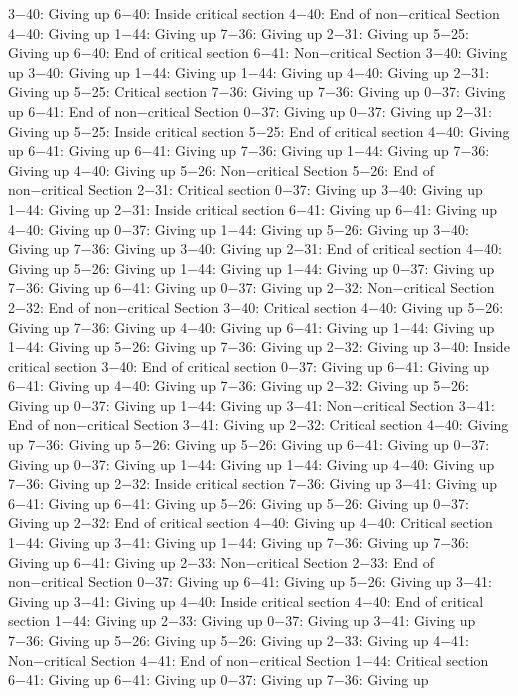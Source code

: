 3−40: Giving up
6−40: Inside critical section
4−40: End of non−critical Section
4−40: Giving up
1−44: Giving up
7−36: Giving up
2−31: Giving up
5−25: Giving up
6−40: End of critical section
6−41: Non−critical Section
3−40: Giving up
3−40: Giving up
1−44: Giving up
1−44: Giving up
4−40: Giving up
2−31: Giving up
5−25: Critical section
7−36: Giving up
7−36: Giving up
0−37: Giving up
6−41: End of non−critical Section
0−37: Giving up
0−37: Giving up
2−31: Giving up
5−25: Inside critical section
5−25: End of critical section
4−40: Giving up
6−41: Giving up
6−41: Giving up
7−36: Giving up
1−44: Giving up
7−36: Giving up
4−40: Giving up
5−26: Non−critical Section
5−26: End of non−critical Section
2−31: Critical section
0−37: Giving up
3−40: Giving up
1−44: Giving up
2−31: Inside critical section
6−41: Giving up
6−41: Giving up
4−40: Giving up
0−37: Giving up
1−44: Giving up
5−26: Giving up
3−40: Giving up
7−36: Giving up
3−40: Giving up
2−31: End of critical section
4−40: Giving up
5−26: Giving up
1−44: Giving up
1−44: Giving up
0−37: Giving up
7−36: Giving up
6−41: Giving up
0−37: Giving up
2−32: Non−critical Section
2−32: End of non−critical Section
3−40: Critical section
4−40: Giving up
5−26: Giving up
7−36: Giving up
4−40: Giving up
6−41: Giving up
1−44: Giving up
1−44: Giving up
5−26: Giving up
7−36: Giving up
2−32: Giving up
3−40: Inside critical section
3−40: End of critical section
0−37: Giving up
6−41: Giving up
6−41: Giving up
4−40: Giving up
7−36: Giving up
2−32: Giving up
5−26: Giving up
0−37: Giving up
1−44: Giving up
3−41: Non−critical Section
3−41: End of non−critical Section
3−41: Giving up
2−32: Critical section
4−40: Giving up
7−36: Giving up
5−26: Giving up
5−26: Giving up
6−41: Giving up
0−37: Giving up
0−37: Giving up
1−44: Giving up
1−44: Giving up
4−40: Giving up
7−36: Giving up
2−32: Inside critical section
7−36: Giving up
3−41: Giving up
6−41: Giving up
6−41: Giving up
5−26: Giving up
5−26: Giving up
0−37: Giving up
2−32: End of critical section
4−40: Giving up
4−40: Critical section
1−44: Giving up
3−41: Giving up
1−44: Giving up
7−36: Giving up
7−36: Giving up
6−41: Giving up
2−33: Non−critical Section
2−33: End of non−critical Section
0−37: Giving up
6−41: Giving up
5−26: Giving up
3−41: Giving up
3−41: Giving up
4−40: Inside critical section
4−40: End of critical section
1−44: Giving up
2−33: Giving up
0−37: Giving up
3−41: Giving up
7−36: Giving up
5−26: Giving up
5−26: Giving up
2−33: Giving up
4−41: Non−critical Section
4−41: End of non−critical Section
1−44: Critical section
6−41: Giving up
6−41: Giving up
0−37: Giving up
7−36: Giving up
